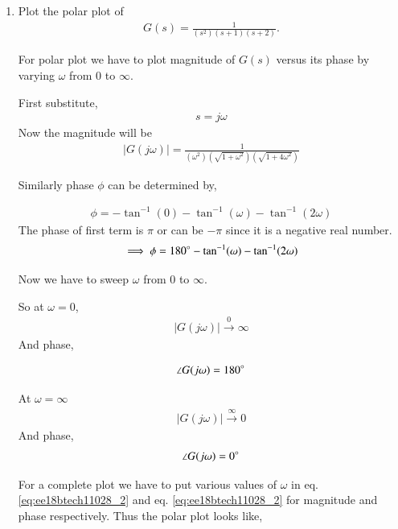 \begin{enumerate}[label=\thesection.\arabic*.,ref=\thesection.\theenumi]
\item Plot the polar plot of 
\begin{align}
    G(s) = \frac{1}{(s^2)(s+1)(s+2)}. 
    \label{eq:ee18btech11028_1}
\end{align}

\solution
For polar plot we have to plot magnitude of $G(s)$ versus its phase
by varying $\omega$ from 0 to $\infty$.

First substitute, 
\begin{align}
    s = j\omega
\end{align}
Now the magnitude will be
\begin{align}
    |G(j\omega)| = \frac{1}{(\omega^2)(\sqrt{1 + \omega^2})(\sqrt{1+4\omega^2})}
    \label{eq:ee18btech11028_2}
\end{align}


Similarly phase $\phi$ can be determined by,

\begin{align}
  \phi = - \tan^{-1}(0) - \tan^{-1}(\omega) - \tan^{-1}(2\omega)
\end{align}
The phase of first term is $\pi$ or can be $-\pi$ since it is a negative real number.
\begin{align}
    \implies \phi = 180\degree - \tan^{-1}(\omega) - \tan^{-1}(2\omega)
    \label{eq:ee18btech11028_3}
\end{align}

Now we have to sweep $\omega$ from 0 to $\infty$.

So at $\omega = 0$,
\begin{align}
    |G(j \omega)| \xrightarrow{0} \infty 
    \label{eq:ee18btech11028_4}
\end{align}
And phase,

\begin{align}
    \angle {G(j \omega)} = 180 \degree
    \label{eq:ee18btech11028_5}
\end{align}

At $\omega = \infty$
\begin{align}
    |G(j \omega)| \xrightarrow{\infty} 0
\end{align}
 And phase,
\begin{align}
    \angle {G(j \omega)} = 0 \degree
\end{align}

For a complete plot we have to put various values of $\omega$ in 
eq. \ref{eq:ee18btech11028_2} and eq. \ref{eq:ee18btech11028_2} for magnitude and phase respectively.
Thus the polar plot looks like, 



\end{enumerate}
